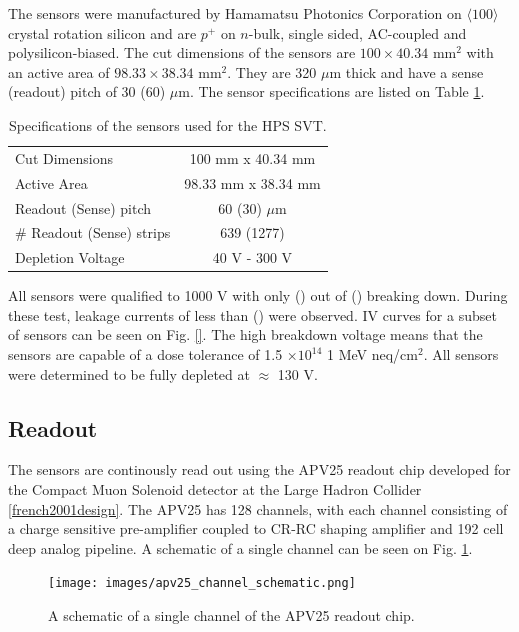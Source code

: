 The sensors were manufactured by Hamamatsu Photonics Corporation on 
$\langle 100 \rangle$ crystal rotation silicon and are $p^{+}$ on $n$-bulk, 
single sided, AC-coupled and polysilicon-biased. The cut dimensions of the 
sensors are $100 \times 40.34$ mm$^{2}$ with an active area of 
$98.33 \times 38.34$ mm$^{2}$.  They are 320 $\mu$m thick and have a sense
(readout) pitch of 30 (60) $\mu$m. The sensor specifications are listed on 
Table \ref{tab:sensor_specs}.
\begin{table}[t]
    \centering
    \begin{tabular}{l|c}
        \hline
        Cut Dimensions & 100 mm x 40.34 mm \\
        Active Area & 98.33 mm x 38.34 mm \\
        Readout (Sense) pitch & 60 (30) $\mu$m \\
        \# Readout (Sense) strips & 639 (1277) \\
        Depletion Voltage & 40 V - 300 V \\
        \hline
    \end{tabular}
    \caption{Specifications of the sensors used for the HPS SVT.}
    \label{tab:sensor_specs}
\end{table}

All sensors were qualified to 1000 V with only () out of () breaking down.  
During these test, leakage currents of less than () were observed. IV curves
for a subset of sensors can be seen on Fig. \ref{}.  The high breakdown voltage
means that the sensors are capable of a dose tolerance of  1.5 
$\times 10^{14}$ 1 MeV neq/cm$^{2}$.  All sensors were determined to be fully 
depleted at $\approx$ 130 V. 

\subsection*{Readout}

The sensors are continously read out using the APV25 readout chip developed for
the Compact Muon Solenoid detector at the Large Hadron Collider 
\ref{french2001design}. The APV25 has 128 channels, with each channel consisting
of a charge sensitive pre-amplifier coupled to CR-RC shaping amplifier and 192
cell deep analog pipeline.  A schematic of a single channel can be seen on 
Fig. \ref{fig:apv25_schem}.
\begin{figure}
    \centering
    \texttt{[image: images/apv25\_channel\_schematic.png]}
    \caption{A schematic of a single channel of the APV25 readout chip.}
    \label{fig:apv25_schem}
\end{figure}

